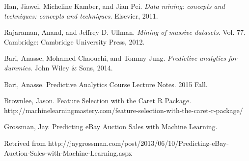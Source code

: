\documentclass[CEJM,PDF]{cej} %
\begin{document}
\begin{thebibliography}{9}

Han, Jiawei, Micheline Kamber, and Jian Pei.\textit{ Data mining: concepts and techniques: concepts and techniques}. Elsevier, 2011.

 Rajaraman, Anand, and Jeffrey D. Ullman. \textit{Mining of massive datasets}. Vol. 77. Cambridge: Cambridge University Press, 2012.

 Bari, Anasse, Mohamed Chaouchi, and Tommy Jung. \textit{Predictive analytics for dummies}. John Wiley \& Sons, 2014.	

 Bari, Anasse. Predictive Analytics Course Lecture Notes. 2015 Fall.

  Brownlee, Jason. Feature Selection with the Caret R Package. http://machinelearningmastery.com/feature-selection-with-the-caret-r-package/

 Grossman, Jay. Predicting eBay Auction Sales with Machine Learning.

Retrived from http://jaygrossman.com/post/2013/06/10/Predicting-eBay-Auction-Sales-with-Machine-Learning.aspx


\end{thebibliography}
\end{document}
